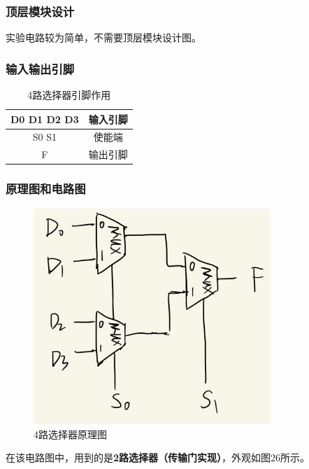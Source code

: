 \documentclass{article}
\begin{document}
    \subsubsection{顶层模块设计}
    实验电路较为简单，不需要顶层模块设计图。

    \subsubsection{输入输出引脚}
    \begin{table}[H]
    \centering
    \begin{tabular}{|c|c|}
        \hline
        D0 D1 D2 D3 & 输入引脚 \\ \hline
        S0 S1 & 使能端 \\ \hline 
        F   & 输出引脚 \\ \hline
    \end{tabular}
    \caption{4路选择器引脚作用}
    \end{table}

    \subsubsection{原理图和电路图}
    \begin{figure}[H]
    \centering
    \includegraphics[width=0.8\textwidth]{6.4.1.png}
    \caption{4路选择器原理图}
    \end{figure}

    在该电路图中，用到的是\textbf{2路选择器（传输门实现）}，外观如图26所示。
\end{document}
